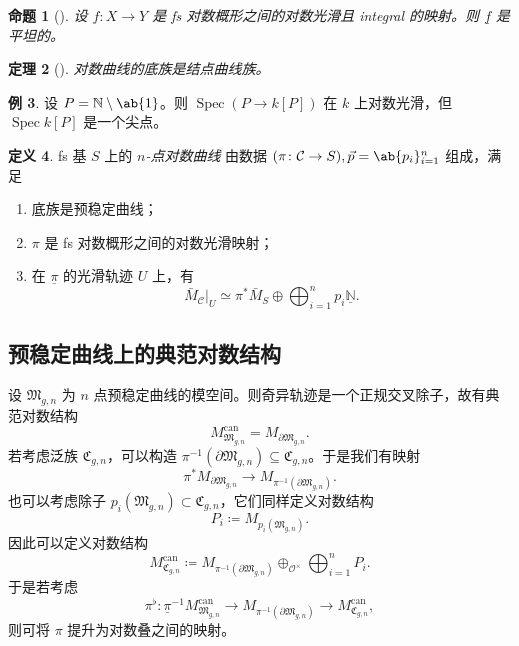 \documentclass{amsart}
\newtheorem{thm}{定理}[section]
\newtheorem{prop}[thm]{命题}
\theoremstyle{definition}
\newtheorem{defn}[thm]{定义}
\newtheorem{exm}[thm]{例}
\theoremstyle{remark}
\theoremstyle{plain}
\theoremstyle{definition}
\theoremstyle{remark}
\newcommand{\N}{\mathbb{N}}
\newcommand{\mc}[1]{\mathcal{#1}}
\newcommand{\mf}[1]{\mathfrak{#1}}
\newcommand{\on}[1]{\operatorname{#1}}
\newcommand{\ul}[1]{\underline{#1}}
\newcommand{\1}{\mathbf{1}}
\newcommand{\2}{\mathbf{2}}
\newcommand{\3}{\mathbf{3}}
\DeclareMathOperator{\Spec}{Spec}
\begin{document}
\begin{prop}[{\cite{Kato1989}}]
    设 \(f \colon X \to Y\) 是 fs 对数概形之间的对数光滑且 integral 的映射。则 \(\ul{f}\) 是平坦的。
\end{prop}

\begin{thm}[{\cite{FKato2000}}]
    对数曲线的底族是结点曲线族。
\end{thm}

\begin{exm}
    设 \(P = \N \setminus \ab\{1\}\)。则 \(\Spec (P \to k[P])\) 在 \(k\) 上对数光滑，但 \(\Spec k[P]\) 是一个尖点。
\end{exm}

\begin{defn}
    fs 基 \(S\) 上的 \textit{\(n\)-点对数曲线} 由数据 \((\pi \colon \mc{C} \to S), \vec{p} = \ab\{p_i\}_{i=1}^n\) 组成，满足
    \begin{enumerate}
        \item 底族是预稳定曲线；
        \item \(\pi\) 是 fs 对数概形之间的对数光滑映射；
        \item 在 \(\ul{\pi}\) 的光滑轨迹 \(U\) 上，有
            \[ \bar{M}_{\mc{C}}|_U \simeq \pi^* \bar{M}_S \oplus \bigoplus_{i=1}^n p_i \ul{\N}. \]
    \end{enumerate}
\end{defn}

\subsection{预稳定曲线上的典范对数结构}%
\label{sub:Canonical log structures on prestable curves}

设 \(\mf{M}_{g,n}\) 为 \(n\) 点预稳定曲线的模空间。则奇异轨迹是一个正规交叉除子，故有典范对数结构
\[ M_{\mf{M}_{g,n}}^{\on{can}} = M_{\partial \mf{M}_{g,n}}. \]
若考虑泛族 \(\mf{C}_{g,n}\)，可以构造 \(\pi^{-1}(\partial \mf{M}_{g,n}) \subseteq \mf{C}_{g,n}\)。于是我们有映射
\[ \pi^* M_{\partial \mf{M}_{g,n}} \to M_{\pi^{-1}(\partial \mf{M}_{g,n})}. \]
也可以考虑除子 \(p_i(\mf{M}_{g,n}) \subset \mf{C}_{g,n}\)，它们同样定义对数结构
\[ P_i \coloneqq M_{p_i(\mf{M}_{g,n})}. \]
因此可以定义对数结构
\[ M_{\mf{C}_{g,n}}^{\on{can}} \coloneqq M_{\pi^{-1}(\partial\mf{M}_{g,n})} \oplus_{\mc{O}^{\times}} \bigoplus_{i=1}^n P_i. \]
于是若考虑
\[ \pi^{\flat} \colon \ul{\pi}^{-1} M_{\mf{M}_{g,n}}^{\on{can}} \to M_{\pi^{-1}(\partial \mf{M}_{g,n})} \to M_{\mf{C}_{g,n}}^{\on{can}}, \]
则可将 \(\pi\) 提升为对数叠之间的映射。
\end{document}
